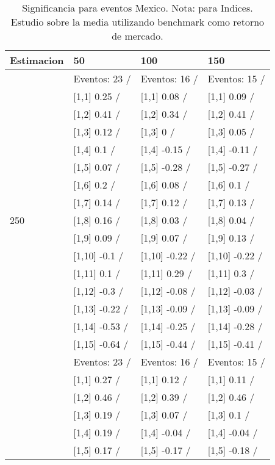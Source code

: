 \begin{table}

\caption{Significancia para eventos Mexico. Nota: para Indices. Estudio sobre la media utilizando benchmark como retorno de mercado.}
\centering
\begin{tabular}[t]{llll}
\toprule
Estimacion & 50 & 100 & 150\\
\midrule
 & Eventos:  23 / & Eventos:  16 / & Eventos:  15 /\\
 & {}[1,1] 0.25  / & {}[1,1] 0.08  / & {}[1,1] 0.09  /\\
 & {}[1,2] 0.41  / & {}[1,2] 0.34  / & {}[1,2] 0.41  /\\
 & {}[1,3] 0.12  / & {}[1,3] 0  / & {}[1,3] 0.05  /\\
 & {}[1,4] 0.1  / & {}[1,4] -0.15  / & {}[1,4] -0.11  /\\
\addlinespace
 & {}[1,5] 0.07  / & {}[1,5] -0.28  / & {}[1,5] -0.27  /\\
 & {}[1,6] 0.2  / & {}[1,6] 0.08  / & {}[1,6] 0.1  /\\
 & {}[1,7] 0.14  / & {}[1,7] 0.12  / & {}[1,7] 0.13  /\\
250 & {}[1,8] 0.16  / & {}[1,8] 0.03  / & {}[1,8] 0.04  /\\
 & {}[1,9] 0.09  / & {}[1,9] 0.07  / & {}[1,9] 0.13  /\\
\addlinespace
 & {}[1,10] -0.1  / & {}[1,10] -0.22  / & {}[1,10] -0.22  /\\
 & {}[1,11] 0.1  / & {}[1,11] 0.29  / & {}[1,11] 0.3  /\\
 & {}[1,12] -0.3  / & {}[1,12] -0.08  / & {}[1,12] -0.03  /\\
 & {}[1,13] -0.22  / & {}[1,13] -0.09  / & {}[1,13] -0.09  /\\
 & {}[1,14] -0.53  / & {}[1,14] -0.25  / & {}[1,14] -0.28  /\\
\addlinespace
 & {}[1,15] -0.64  / & {}[1,15] -0.44  / & {}[1,15] -0.41  /\\
 & Eventos:  23 / & Eventos:  16 / & Eventos:  15 /\\
 & {}[1,1] 0.27  / & {}[1,1] 0.12  / & {}[1,1] 0.11  /\\
 & {}[1,2] 0.46  / & {}[1,2] 0.39  / & {}[1,2] 0.46  /\\
 & {}[1,3] 0.19  / & {}[1,3] 0.07  / & {}[1,3] 0.1  /\\
\addlinespace
 & {}[1,4] 0.19  / & {}[1,4] -0.04  / & {}[1,4] -0.04  /\\
 & {}[1,5] 0.17  / & {}[1,5] -0.17  / & {}[1,5] -0.18  /\\

\end{tabular}
\end{table}
